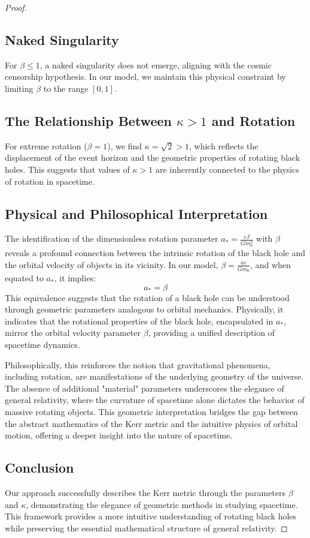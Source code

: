 \documentclass{article}
\begin{document}
\begin{proof}
\subsection{Naked Singularity}
For \(\beta \leq 1\), a naked singularity does not emerge, aligning with the cosmic censorship hypothesis. In our model, we maintain this physical constraint by limiting \(\beta\) to the range \([0, 1]\).

\subsection{The Relationship Between \(\kappa > 1\) and Rotation}
For extreme rotation (\(\beta = 1\)), we find \(\kappa = \sqrt{2} > 1\), which reflects the displacement of the event horizon and the geometric properties of rotating black holes. This suggests that values of \(\kappa > 1\) are inherently connected to the physics of rotation in spacetime.

\subsection{Physical and Philosophical Interpretation}
The identification of the dimensionless rotation parameter \(a_* = \frac{c J}{G m_0^2}\) with \(\beta\) reveals a profound connection between the intrinsic rotation of the black hole and the orbital velocity of objects in its vicinity. In our model, \(\beta = \frac{a c}{G m_0}\), and when equated to \(a_*\), it implies:
\[
a_* = \beta
\]
This equivalence suggests that the rotation of a black hole can be understood through geometric parameters analogous to orbital mechanics. Physically, it indicates that the rotational properties of the black hole, encapsulated in \(a_*\), mirror the orbital velocity parameter \(\beta\), providing a unified description of spacetime dynamics.

Philosophically, this reinforces the notion that gravitational phenomena, including rotation, are manifestations of the underlying geometry of the universe. The absence of additional "material" parameters underscores the elegance of general relativity, where the curvature of spacetime alone dictates the behavior of massive rotating objects. This geometric interpretation bridges the gap between the abstract mathematics of the Kerr metric and the intuitive physics of orbital motion, offering a deeper insight into the nature of spacetime.

\subsection{Conclusion}
Our approach successfully describes the Kerr metric through the parameters \(\beta\) and \(\kappa\), demonstrating the elegance of geometric methods in studying spacetime. This framework provides a more intuitive understanding of rotating black holes while preserving the essential mathematical structure of general relativity.



\end{proof}
\end{document}
